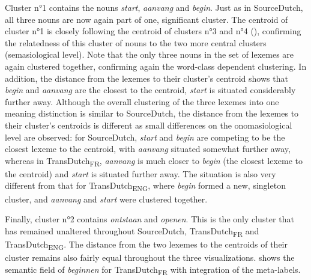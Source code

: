 Cluster n°1 contains the nouns \textit{start}, \textit{aanvang} and \textit{begin}. Just as in SourceDutch, all three nouns are now again part of one, significant cluster. The centroid of cluster n°1 is closely following the centroid of clusters n°3 and n°4 (), confirming the relatedness of this cluster of nouns to the two more central clusters (semasiological level). Note that the only three nouns in the set of lexemes are again clustered together, confirming again the word-class dependent clustering. In addition, the distance from the lexemes to their cluster’s centroid shows that \textit{begin} and \textit{aanvang} are the closest to the centroid, \textit{start} is situated considerably further away. Although the overall clustering of the three lexemes into one meaning distinction is similar to SourceDutch, the distance from the lexemes to their cluster’s centroids is different as small differences on the onomasiological level are observed: for SourceDutch, \textit{start} and \textit{begin} are competing to be the closest lexeme to the centroid, with \textit{aanvang} situated somewhat further away, whereas in TransDutch\textsubscript{FR}, \textit{aanvang} is much closer to \textit{begin} (the closest lexeme to the centroid) and \textit{start} is situated further away. The situation is also very different from that for TransDutch\textsubscript{ENG}, where \textit{begin} formed a new, singleton cluster, and \textit{aanvang} and \textit{start} were clustered together.

Finally, cluster n°2 contains \textit{ontstaan} and \textit{openen}. This is the only cluster that has remained unaltered throughout SourceDutch, TransDutch\textsubscript{FR} and TransDutch\textsubscript{ENG}. The distance from the two lexemes to the centroids of their cluster remains also fairly equal throughout the three visualizations.  shows the semantic field of \textit{beginnen} for TransDutch\textsubscript{FR} with integration of the meta-labels.

